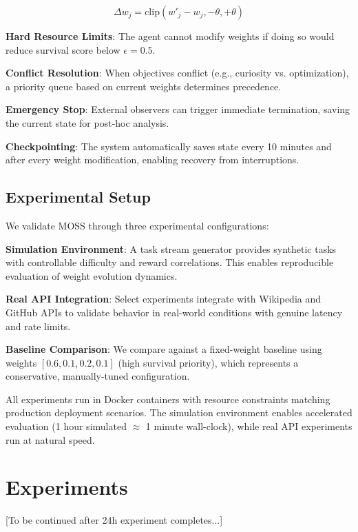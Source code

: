 \documentclass{article}
\begin{document}
\begin{equation}
\Delta w_j = \text{clip}(w'_j - w_j, -\theta, +\theta)
\end{equation}

\textbf{Hard Resource Limits}: The agent cannot modify weights if doing so would reduce survival score below $\epsilon = 0.5$.

\textbf{Conflict Resolution}: When objectives conflict (e.g., curiosity vs. optimization), a priority queue based on current weights determines precedence.

\textbf{Emergency Stop}: External observers can trigger immediate termination, saving the current state for post-hoc analysis.

\textbf{Checkpointing}: The system automatically saves state every 10 minutes and after every weight modification, enabling recovery from interruptions.

\subsection{Experimental Setup}

We validate MOSS through three experimental configurations:

\textbf{Simulation Environment}: A task stream generator provides synthetic tasks with controllable difficulty and reward correlations. This enables reproducible evaluation of weight evolution dynamics.

\textbf{Real API Integration}: Select experiments integrate with Wikipedia and GitHub APIs to validate behavior in real-world conditions with genuine latency and rate limits.

\textbf{Baseline Comparison}: We compare against a fixed-weight baseline using weights $[0.6, 0.1, 0.2, 0.1]$ (high survival priority), which represents a conservative, manually-tuned configuration.

All experiments run in Docker containers with resource constraints matching production deployment scenarios. The simulation environment enables accelerated evaluation (1 hour simulated $\approx$ 1 minute wall-clock), while real API experiments run at natural speed.

\section{Experiments}
\label{sec:experiments}

[To be continued after 24h experiment completes...]
\end{document}
